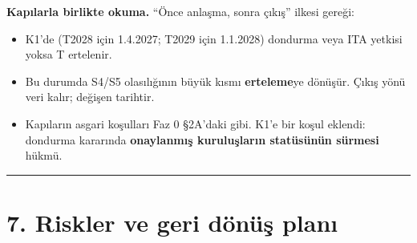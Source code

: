 \textbf{Kapılarla birlikte okuma.} ``Önce anlaşma, sonra çıkış'' ilkesi gereği:

\begin{itemize}
\tightlist
\item
  K1'de (T2028 için 1.4.2027; T2029 için 1.1.2028) dondurma veya ITA yetkisi yoksa T ertelenir.
\item
  Bu durumda S4/S5 olasılığının büyük kısmı \textbf{erteleme}ye dönüşür. Çıkış yönü veri kalır; değişen tarihtir.
\item
  Kapıların asgari koşulları Faz 0 §2A'daki gibi. K1'e bir koşul eklendi: dondurma kararında \textbf{onaylanmış kuruluşların statüsünün sürmesi} hükmü.
\end{itemize}

\begin{center}\rule{0.5\linewidth}{0.5pt}\end{center}

\hypertarget{02b_secenekler_hukuk-7-riskler-ve-geri-duxf6nuxfcux15f-planux131}{%
\section{7. Riskler ve geri dönüş planı}\label{02b_secenekler_hukuk-7-riskler-ve-geri-duxf6nuxfcux15f-planux131}}

\begingroup\gbtablo\footnotesize


